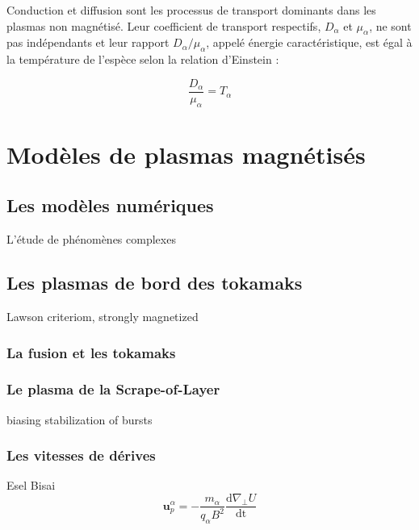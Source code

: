 \begin{refsection}
Conduction et diffusion sont les processus de transport dominants dans les
plasmas non magnétisé. Leur coefficient de transport respectifs, $D_\alpha$ et
$\mu_\alpha$, ne sont pas indépendants et leur rapport $D_\alpha/\mu_\alpha$,
appelé énergie caractéristique, est égal à la température de l'espèce selon la relation
d'Einstein :
 
\begin{equation}
    \frac{D_\alpha}{\mu_\alpha}=T_\alpha
\end{equation}
 
\section{Modèles de plasmas magnétisés}
\subsection{Les modèles numériques}
L'étude de phénomènes complexes
%

\subsection{Les plasmas de bord des tokamaks}
Lawson criteriom, strongly magnetized
\subsubsection{La fusion et les tokamaks}
\subsubsection{Le plasma de la Scrape-of-Layer}
\parencite{Ghendrih}biasing stabilization of bursts


\subsubsection{Les vitesses de dérives}
\parencite{Garcia}Esel
\parencite{Bisai}Bisai
\label{vitessesDerive}
\begin{equation}
\label{1-vitessePol}
\mathbf{u}_p^\alpha=-\frac{m_\alpha}{q_\alpha B^2}\frac{\text{d}\nabla_\perp
U}{\text{dt}}
\end{equation}




\end{refsection}
